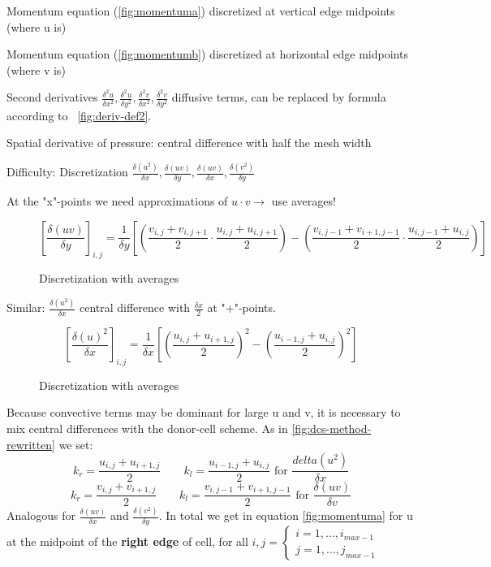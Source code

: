 Momentum equation (\ref{fig:momentuma}) discretized at vertical edge midpoints (where u is)

Momentum equation (\ref{fig:momentumb}) discretized at horizontal edge midpoints (where v is)

Second derivatives $\frac{\delta^2 u}{\delta x^2}, \frac{\delta^2 u}{\delta y^2}, \frac{\delta^2 v}{\delta x^2}, \frac{\delta^2 v}{\delta y^2}$ diffusive terms, can be replaced by formula according to ~\ref{fig:deriv-def2}.

Spatial derivative of pressure: central difference with half the mesh width

Difficulty: Discretization $\frac{\delta(u^2)}{\delta x}, \frac{\delta(uv)}{\delta y}, \frac{\delta(uv)}{\delta x}, \frac{\delta(v^2)}{\delta y}$

At the "x"-points we need approximations of $u \cdot v \rightarrow$ use averages!

\begin{figure}[H]
	\centering
	\[ \left[ \frac{\delta (uv)}{\delta y}\right]_{i,j} = \frac{1}{\delta y}\left[ \left( \frac{v_{i,j} + v_{i,j+1}}{2} \cdot \frac{u_{i,j} + u_{i,j+1}}{2} \right) - \left( \frac{v_{i,j-1} + v_{i+1, j-1}}{2} \cdot \frac{u_{i,j-1} + u_{i,j}}{2}\right) \right] \]
	\renewcommand{\thefigure}{3.17}
	\caption{Discretization with averages}
	\label{fig:disc-spec}
\end{figure}

Similar: $\frac{\delta(u^2)}{\delta x}$ central difference with $\frac{\delta x}{2}$ at "+"-points.

\begin{figure}[H]
	\centering
	\[ \left[ \frac{\delta (u)^2}{\delta x}\right]_{i,j} = \frac{1}{\delta x}\left[ \left( \frac{u_{i,j} + u_{i+1,j}}{2}\right)^2 - \left( \frac{u_{i-1,j} + u_{i, j}}{2}\right)^2 \right] \]
	\renewcommand{\thefigure}{3.18}
	\caption{Discretization with averages}
	\label{fig:disc-spec}
\end{figure}

Because convective terms may be dominant for large u and v, it is necessary to mix central differences with the donor-cell scheme. As in \ref{fig:dcs-method-rewritten} we set:
\[ k_r = \frac{u_{i,j} + u_{i+1,j}}{2} \qquad k_l = \frac{u_{i-1,j} + u_{i,j}}{2} \text{ for } \frac{delta(u^2)}{\delta x}\]
\[ k_r = \frac{v_{i,j} + v_{i+1,j}}{2} \qquad k_l = \frac{v_{i,j-1} + v_{i+1,j-1}}{2} \text{ for } \frac{\delta(uv)}{\delta v}\]
Analogous for $\frac{\delta(uv)}{\delta x}$ and $\frac{\delta(v^2)}{\delta y}$. In total we get in equation \ref{fig:momentuma} for u at the midpoint of the \textbf{right edge} of cell, for all $i,j = \begin{cases}
i = 1, \dots, i_{max-1} \\
j = 1, \dots, j_{max-1}
\end{cases}$

